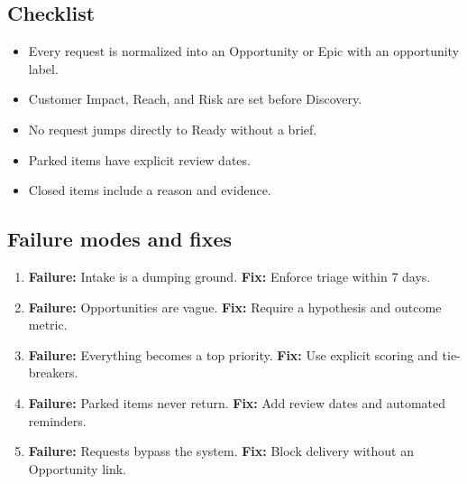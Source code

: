 \subsection{Checklist}
\begin{itemize}
  \item Every request is normalized into an Opportunity or Epic with an opportunity label.
  \item Customer Impact, Reach, and Risk are set before Discovery.
  \item No request jumps directly to Ready without a brief.
  \item Parked items have explicit review dates.
  \item Closed items include a reason and evidence.
\end{itemize}

\subsection{Failure modes and fixes}
\begin{enumerate}
  \item \textbf{Failure:} Intake is a dumping ground. \textbf{Fix:} Enforce triage within 7 days.
  \item \textbf{Failure:} Opportunities are vague. \textbf{Fix:} Require a hypothesis and outcome metric.
  \item \textbf{Failure:} Everything becomes a top priority. \textbf{Fix:} Use explicit scoring and tie-breakers.
  \item \textbf{Failure:} Parked items never return. \textbf{Fix:} Add review dates and automated reminders.
  \item \textbf{Failure:} Requests bypass the system. \textbf{Fix:} Block delivery without an Opportunity link.
\end{enumerate}










